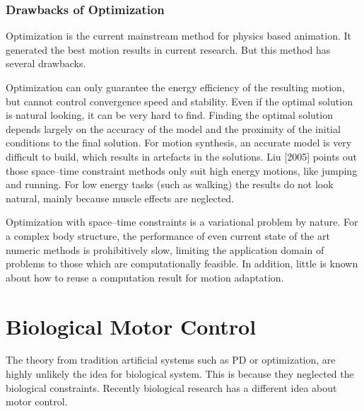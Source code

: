 \subsubsection*{Drawbacks of Optimization}
Optimization is the current mainstream method for physics based animation.
It generated the best motion results in current research.
But this method has several drawbacks.

\begin{itemize}
Optimization can only guarantee the energy efficiency of the resulting motion, but cannot control convergence speed and stability.
Even if the optimal solution is natural looking, it can be very hard to find. Finding the optimal solution depends largely on the accuracy of the model and the proximity of the initial conditions to the final solution. For motion synthesis, an accurate model is very difficult to build, which results in artefacts in the solutions. Liu [2005] points out those space–time constraint methods only suit high energy motions, like jumping and running.
For low energy tasks (such as walking) the results do not look natural, mainly because muscle effects are neglected.

Optimization with space–time constraints is a variational problem by nature. For a complex body structure, the performance of even current state of the art numeric methods is prohibitively slow, limiting the application domain of problems to those which are computationally feasible. In addition, little is known about how to reuse a computation result for motion adaptation.

\end{itemize}


\section{Biological Motor Control}
The theory from tradition artificial systems such as PD or optimization, are highly unlikely the idea for biological system. 
This is because they neglected the biological constraints.
Recently biological research has a different idea about motor control.

